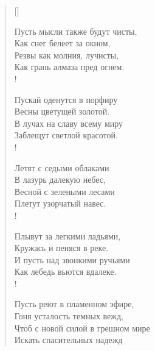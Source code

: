 \newpage
\vspace*{0cm}


\settowidth{\versewidth}{Пусть мысли также будут чисты,}
\begin{verse}[\versewidth]
\begin{altverse}
Пусть мысли также будут чисты,\\
          Как снег белеет за окном,\\
Резвы как молния, лучисты,\\
          Как грань алмаза пред огнем.\\!

Пускай оденутся в порфиру\\
          Весны цветущей золотой.\\
В лучах на славу всему миру\\
          Заблещут светлой красотой.\\!

Летят с седыми облаками\\
          В лазурь далекую небес,\\
Весной с зелеными лесами\\
          Плетут узорчатый навес.\\!

Плывут за легкими ладьями,\\
          Кружась и пеняся в реке.\\
И пусть над звонкими ручьями\\
          Как лебедь вьются вдалеке.\\!

Пусть реют в пламенном эфире,\\
          Гоня усталость темных вежд,\\
Чтоб с новой силой в грешном мире\\
Искать спасительных надежд\ldotst
\end{altverse}
\end{verse}

